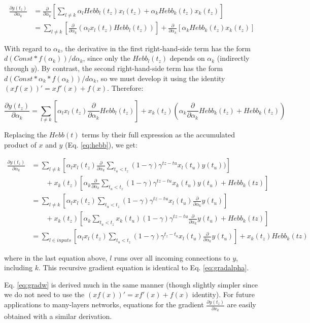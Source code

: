 \documentclass{article}
\begin{document}
\begin{align}
\frac{\partial y(t_z)}{\partial \alpha_k} &= \frac{\partial }{\partial \alpha_k}[
\sum_{l \neq k }\alpha_l Hebb_l(t_z) x_l(t_z) + \alpha_k Hebb_k(t_z) x_k(t_z)]\\
&= \sum_{l \neq k }[\frac{\partial }{\partial \alpha_k} (\alpha_l x_l(t_z) Hebb_l(t_z))] + \frac{\partial }{\partial \alpha_k}[\alpha_k Hebb_k(t_z) x_k(t_z)]
\end{align}

With regard to $\alpha_k$, the derivative in the first right-hand-side term has the
form $d(Const*f(\alpha_k))/d\alpha_k$, since only the $Hebb_l(t_z)$ depends on $\alpha_k$
(indirectly through $y$). By contrast, the second right-hand-side term has the
form $d(Const*\alpha_k*f(\alpha_k))/d\alpha_k$, so we must develop it using the identity
$(xf(x))'=xf'(x)+f(x)$. Therefore:

\[
\frac{\partial y(t_z)}{\partial \alpha_k} = \sum_{l \neq k }[\alpha_l
x_l(t_z)\frac{\partial }{\partial \alpha_k}Hebb_l(t_z)] +
x_k(t_z)(\alpha_k\frac{\partial }{\partial \alpha_k}Hebb_k(t_z) + Hebb_k(t_z))
\]

Replacing the $Hebb(t)$ terms by their full expression as the accumulated product of $x$ and
$y$ (Eq. \ref{eq:hebb}), we get:

\begin{align}
\frac{\partial y(t_z)}{\partial \alpha_k} &= \sum_{l \neq k }[\alpha_l x_l(t_z) \frac{\partial }{\partial
\alpha_k}\sum_{t_u < t_z}(1-\gamma)\gamma^{tz-tu}x_l(t_u)y(t_u))] \nonumber \\ 
& \qquad {} + x_k(t_z)[\alpha_k\frac{\partial}{\partial \alpha_k}\sum_{t_u <
t_z}(1-\gamma)\gamma^{tz-tu}x_k(t_u)y(t_u) + Hebb_k(tz)]\\
&= \sum_{l \neq k }[\alpha_l x_l(t_z) \sum_{t_u < t_z}(1-\gamma)\gamma^{tz-tu}x_l(t_u)\frac{\partial }{\partial
\alpha_k}y(t_u)] \nonumber \\
& \qquad {} + x_k(t_z)[\alpha_k\sum_{t_u <
t_z}x_k(t_u)(1-\gamma)\gamma^{tz-tu}\frac{\partial}{\partial \alpha_k}y(t_u) + Hebb_k(tz)]\\
&= \sum_{l \in inputs}[\alpha_l x_l(t_z)\sum_{t_u <
t_z}(1-\gamma)\gamma^{t_z-t_u}x_l(t_u)\frac{\partial
}{\partial
\alpha_k}y(t_u)] +
x_k(t_z)Hebb_k(tz)
\end{align}


where in the last equation above, $l$ runs over all incoming connections to $y$,
including $k$. This recursive gradient equation is identical to Eq.
\ref{eq:gradalpha}.

Eq. \ref{eq:gradw} is derived much in the same manner (though slightly simpler
since we do not need to use the $(xf(x))'=xf'(x)+f(x)$ identity). For future applications to
many-layers networks, equations for the gradient
$\frac{\partial y(t_z)}{\partial x_k}$ are easily obtained with a similar
derivation.

\small
\printbibliography
\end{document}
